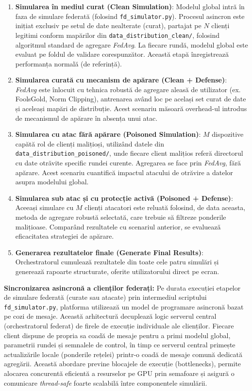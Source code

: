 \documentclass[../../main.tex]{subfiles}
\begin{document}
\begin{enumerate}
        \item \textbf{Simularea în mediul curat (Clean Simulation)}: Modelul global intră în faza de simulare federată (folosind \texttt{fd\_simulator.py}). Procesul asincron este inițiat exclusiv pe setul de date nealterate (curat), partajat pe $N$ clienți legitimi  conform mapărilor din \texttt{data\_distribution\_clean/}, folosind algoritmul standard de agregare \textit{FedAvg}. La fiecare rundă, modelul global este evaluat pe foldul de validare corespunzător. Această etapă înregistrează performanța normală (de referință).
        \item \textbf{Simularea curată cu mecanism de apărare (Clean + Defense)}: \textit{FedAvg} este înlocuit cu tehnica robustă de agregare aleasă de utilizator (ex. FoolsGold, Norm Clipping), antrenarea având loc pe același set curat de date și aceleași mapări de distribuție. Acest scenariu măsoară overhead-ul introdus de mecanismul de apărare în absența unui atac.
        \item \textbf{Simularea cu atac fără apărare (Poisoned Simulation)}: $M$ dispozitive capătă rol de clienți malițioși, utilizând datele din \texttt{data\_distribution\_\-poisoned/}, unde fiecare client malițios referă directorul cu date otrăvite specific rundei curente. Agregarea se face prin \textit{FedAvg}, fără apărare. Acest scenariu cuantifică impactul atacului de otrăvire a datelor asupra modelului global.
        \item \textbf{Simularea sub atac și cu protecție activă (Poisoned + Defense)}: Aceeași simulare cu $M$ clienți atacatori este reluată folosind, de data aceasta, metoda de agregare robustă selectată, care trebuie să filtreze ponderile malițioase. Comparând rezultatele cu scenariul anterior, se evaluează eficacitatea strategiei de apărare.
        \item \textbf{Generarea rezultatelor finale (Generate Final Results)}: Orchestratorul cumulează rezultatele din toate cele patru simulări și generează rapoarte structurate, oferite utilizatorului direct pe ecran.
    \end{enumerate}

    \textbf{Sincronizarea asincronă a clienților federați:} Pe durata execuției etapelor de simulare federată (curate sau atacate) prin intermediul scriptului \texttt{fd\_simula\-tor.py}, platforma utilizează un model de programare asincronă bazat pe cozi de mesaje. Această arhitectură decuplează logic serverul central (orchestratorul federat) de firele de execuție individuale ale clienților. Fiecare client dispune de propria sa coadă de mesaje pentru a primi modelul global, parametrii rundei și semnalele de control, în timp ce serverul central primește actualizările locale (ponderile rețelei) printr-o coadă de mesaje comună dedicată agregării. Această abordare previne blocajele de execuție (bottlenecks), permite alocarea concurentă eficientă a resurselor pe GPU prin semafoare și asigură o comunicare \textit{thread-safe} foarte scalabilă între componentele simulării.
\end{document}
